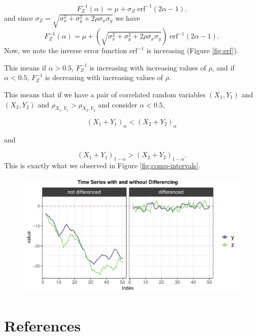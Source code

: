 \documentclass[12pt,twoside]{smiththesis}
\begin{document}
\[F_Z^{-1}(\alpha)=\mu +\sigma_Z \; \text{erf}^{-1}(2\alpha - 1).\]
and since \(\sigma_Z=\sqrt{\sigma_x^2 +\sigma_y^2 + 2 \rho \sigma_x \sigma_y }\) we have
\[F_Z^{-1}(\alpha)=\mu + \left(\sqrt{\sigma_x^2 +\sigma_y^2 + 2 \rho \sigma_x \sigma_y } \right) \; \text{erf}^{-1}(2\alpha - 1).\]
Now, we note the inverse error function \(\text{erf}^{-1}\) is increasing (Figure \ref{fig:erf}).

This means if \(\alpha > 0.5\), \(F_Z^{-1}\) is increasing with increasing values of \(\rho\), and if \(\alpha < 0.5\), \(F_Z^{-1}\) is decreasing with increasing values of \(\rho\).

This means that if we have a pair of correlated random variables \((X_1,Y_1)\) and \((X_2,Y_2)\) and \(\rho_{X_1,Y_1} > \rho_{X_2,Y_2}\) and consider \(\alpha < 0.5\),

\[(X_1+Y_1)_\alpha <(X_2+Y_2)_\alpha\]

and

\[(X_1+Y_1)_{1-\alpha} > (X_2+Y_2)_{1-\alpha}.\]
This is exactly what we observed in Figure \ref{fig:comp-intervals}.
\begin{figure}

{\centering \includegraphics[width=1\linewidth]{thesis_files/figure-latex/unnamed-chunk-91-1} 

}

\caption{\label{fig:erf}}\label{fig:unnamed-chunk-91}
\end{figure}
\backmatter

\hypertarget{references}{%
\chapter*{References}\label{references}}

\end{document}
